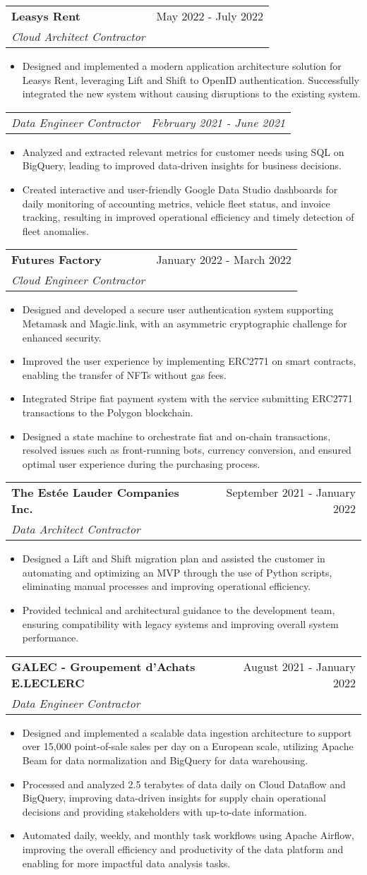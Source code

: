 \documentclass[letterpaper,11pt]{article}
\makeatletter
\newcommand{\resumeItem}[1]{
  \item\small{#1 \vspace{-2pt}}
}
\newcommand{\resumeSubheading}[3]{
  \vspace{-1pt}\item
    \begin{tabular*}{0.97\textwidth}[t]{l@{\extracolsep{\fill}}r}
      \textbf{#1} & #2 \\
      \textit{\small #3} \\
    \end{tabular*}\vspace{-5pt}
}
\newcommand{\resumeSubSubheading}[2]{
  \begin{tabular*}{0.97\textwidth}{l@{\extracolsep{\fill}}r}
    \textit{\small#1} & \textit{\small #2} \\
  \end{tabular*}\vspace{-5pt}
}
\newcommand{\resumeItemListStart}{\begin{itemize}}
\newcommand{\resumeItemListEnd}{\end{itemize}\vspace{-5pt}}
\makeatother
\begin{document}
\resumeSubheading{Leasys Rent}
{May 2022 - July 2022}
{Cloud Architect Contractor}
\resumeItemListStart{}
\resumeItem{
	Designed and implemented a modern application architecture solution for Leasys Rent,
	leveraging Lift and Shift to OpenID authentication. Successfully integrated the
	new system without causing disruptions to the existing system.
}
\resumeItemListEnd{}


\resumeSubSubheading{Data Engineer Contractor}
{February 2021 - June 2021}
\resumeItemListStart{}
\resumeItem{
	Analyzed and extracted relevant metrics for customer needs using SQL on
	BigQuery, leading to improved data-driven insights for business decisions.
}
\resumeItem{
	Created interactive and user-friendly Google Data Studio dashboards for daily
	monitoring of accounting metrics, vehicle fleet status, and invoice tracking,
	resulting in improved operational efficiency and timely detection of fleet
	anomalies.
}
\resumeItemListEnd{}


\resumeSubheading{Futures Factory}
{January 2022 - March 2022}
{Cloud Engineer Contractor}
\resumeItemListStart{}
\resumeItem{
	Designed and developed a secure user authentication system supporting Metamask
	and Magic.link, with an asymmetric cryptographic challenge for enhanced
	security.
}
\resumeItem{
	Improved the user experience by implementing ERC2771 on smart contracts,
	enabling the transfer of NFTs without gas fees.
}
\resumeItem{
	Integrated Stripe fiat payment system with the service submitting ERC2771
	transactions to the Polygon blockchain.
}
\resumeItem{
	Designed a state machine to orchestrate fiat and on-chain transactions, resolved
	issues such as front-running bots, currency conversion, and ensured optimal user
	experience during the purchasing process.
}
\resumeItemListEnd{}


\resumeSubheading{The Estée Lauder Companies Inc.}
{September 2021 - January 2022}
{Data Architect Contractor}
\resumeItemListStart{}
\resumeItem{
	Designed a Lift and Shift migration plan and assisted the customer in automating
	and optimizing an MVP through the use of Python scripts, eliminating manual
	processes and improving operational efficiency.
}
\resumeItem{
	Provided technical and architectural guidance to the development team, ensuring
	compatibility with legacy systems and improving overall system performance.
}
\resumeItemListEnd{}


\resumeSubheading{GALEC - Groupement d'Achats E.LECLERC}
{August 2021 - January 2022}
{Data Engineer Contractor}
\resumeItemListStart{}
\resumeItem{
	Designed and implemented a scalable data ingestion architecture to support over
	15,000 point-of-sale sales per day on a European scale, utilizing Apache Beam
	for data normalization and BigQuery for data warehousing.
}
\resumeItem{
	Processed and analyzed 2.5 terabytes of data daily on Cloud Dataflow and
	BigQuery, improving data-driven insights for supply chain operational decisions
	and providing stakeholders with up-to-date information.
}
\resumeItem{
	Automated daily, weekly, and monthly task workflows using Apache Airflow,
	improving the overall efficiency and productivity of the data platform and
	enabling for more impactful data analysis tasks.
}
\resumeItemListEnd{}
\end{document}
